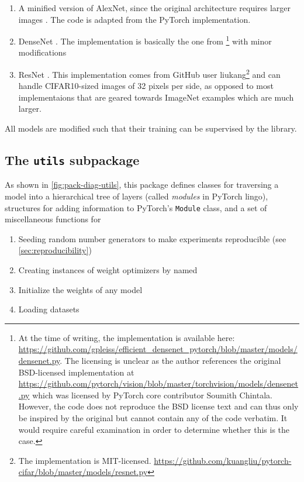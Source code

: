 \begin{enumerate}
    \item
        A minified version of AlexNet, since the original architecture
        requires larger images \citep{krizhevsky2012imagenet}. The
        code is adapted from the PyTorch implementation.
    \item
        DenseNet \citep{huang2017densely}. The implementation is basically the
        one from \citep{pleiss2017memory}\footnote{At the time of writing, the
            implementation is available here:
            \url{https://github.com/gpleiss/efficient_densenet_pytorch/blob/master/models/densenet.py}.
            The licensing is unclear as the author references the original
            BSD-licensed implementation at
            \url{https://github.com/pytorch/vision/blob/master/torchvision/models/densenet.py}
            which was licensed by PyTorch core contributor Soumith Chintala.
            However, the code does not reproduce the BSD license text and can
            thus only be inspired by the original but cannot contain any of the
        code verbatim. It would require careful examination in order to
    determine whether this is the case.} with minor modifications
    \item
        ResNet \citep{he2016deep}. This implementation comes from
        GitHub user liukang\footnote{The implementation is MIT-licensed.
        \url{https://github.com/kuangliu/pytorch-cifar/blob/master/models/resnet.py}}
        and can handle CIFAR10-sized images of 32 pixels per side, as opposed
        to most implementaions that are geared towards ImageNet examples which
        are much larger.
\end{enumerate}

All models are modified such that their training can be supervised by
the library.

\hypertarget{sec:pack-utils}{%
\subsection{The \texttt{utils} subpackage}\label{sec:pack-utils}}

As shown in \cref{fig:pack-diag-utils}, this package defines classes for
traversing a model into a hierarchical tree of layers (called
\emph{modules} in PyTorch lingo), structures for adding information to
PyTorch's \texttt{Module} class, and a set of
miscellaneous functions for

\begin{enumerate}
    \item
        Seeding random number generators to make experiments reproducible (see
        \cref{sec:reproducibility})
    \item
        Creating instances of weight optimizers by named
    \item
        Initialize the weights of any model
    \item
        Loading datasets
\end{enumerate}

